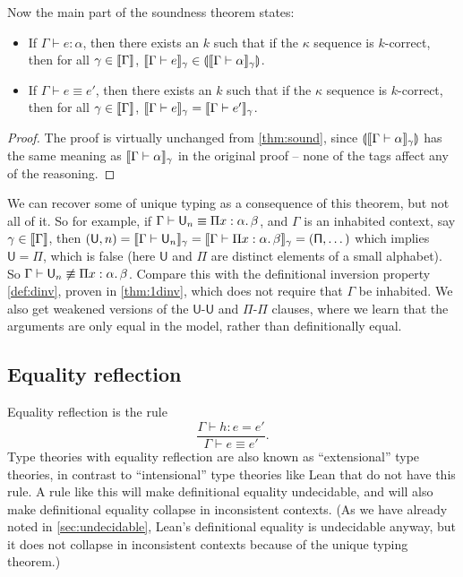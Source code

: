 Now the main part of the soundness theorem states:
\begin{theorem}[Soundness]\label{thm:sound2}
\begin{itemize}
\item If $\Gamma\vdash e:\alpha$, then there exists an $k$ such that if the $\kappa$ sequence is $k$-correct, then for all $\gamma\in\scott{\Gamma}$, $\scott{\Gamma\vdash e}_\gamma\in \ttag{\scott{\Gamma\vdash \alpha}_\gamma}$.
\item If $\Gamma\vdash e\equiv e'$, then there exists an $k$ such that if the $\kappa$ sequence is $k$-correct, then for all $\gamma\in\scott{\Gamma}$, $\scott{\Gamma\vdash e}_\gamma=\scott{\Gamma\vdash e'}_\gamma$.
\end{itemize}
\end{theorem}
\begin{proof}
The proof is virtually unchanged from \autoref{thm:sound}, since $\ttag{\scott{\Gamma\vdash \alpha}_\gamma}$ has the same meaning as $\scott{\Gamma\vdash \alpha}_\gamma$ in the original proof -- none of the tags affect any of the reasoning.
\end{proof}

We can recover some of unique typing as a consequence of this theorem, but not all of it. So for example, if $\Gamma\vdash\U_n\equiv\Pi x:\alpha.\,\beta$, and $\Gamma$ is an inhabited context, say $\gamma\in\scott{\Gamma}$, then $(\mathsf{U},n)=\scott{\Gamma\vdash \U_n}_\gamma=\scott{\Gamma\vdash \Pi x:\alpha.\,\beta}_\gamma=(\mathsf{\Pi},\dots)$ which implies $\mathsf{U}=\mathsf{\Pi}$, which is false (here $\mathsf{U}$ and $\mathsf{\Pi}$ are distinct elements of a small alphabet). So $\Gamma\vdash\U_n\not\equiv\Pi x:\alpha.\,\beta$. Compare this with the definitional inversion property \autoref{def:dinv}, proven in \autoref{thm:1dinv}, which does not require that $\Gamma$ be inhabited. We also get weakened versions of the $\mathsf{U}$-$\mathsf{U}$ and $\mathsf{\Pi}$-$\mathsf{\Pi}$ clauses, where we learn that the arguments are only equal in the model, rather than definitionally equal.

\subsection{Equality reflection}
Equality reflection is the rule
$$\frac{\Gamma\vdash h:e=e'}{\Gamma\vdash e\equiv e'}.$$
Type theories with equality reflection are also known as ``extensional'' type theories, in contrast to ``intensional'' type theories like Lean that do not have this rule. A rule like this will make definitional equality undecidable, and will also make definitional equality collapse in inconsistent contexts. (As we have already noted in \autoref{sec:undecidable}, Lean's definitional equality is undecidable anyway, but it does not collapse in inconsistent contexts because of the unique typing theorem.)

